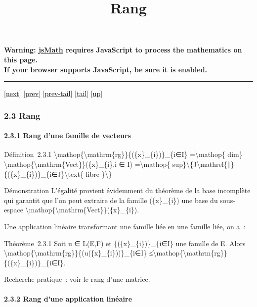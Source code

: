 \documentclass[]{article}
\title{Rang}
\author{}
\date{}
\begin{document}
\maketitle

\textbf{Warning: \href{http://www.math.union.edu/locate/jsMath}{jsMath}
requires JavaScript to process the mathematics on this page.\\ If your
browser supports JavaScript, be sure it is enabled.}

\begin{center}\rule{3in}{0.4pt}\end{center}

{[}\href{coursse10.html}{next}{]} {[}\href{coursse8.html}{prev}{]}
{[}\href{coursse8.html\#tailcoursse8.html}{prev-tail}{]}
{[}\hyperref[tailcoursse9.html]{tail}{]}
{[}\href{coursch3.html\#coursse9.html}{up}{]}

\subsubsection{2.3 Rang}

\paragraph{2.3.1 Rang d'une famille de vecteurs}

Définition~2.3.1
\textbackslash{}mathop\{\textbackslash{}mathrm\{rg\}\}\{(\{x\}\_\{i\})\}\_\{i∈I\}
=\textbackslash{}mathop\{ dim\}
\textbackslash{}mathop\{\textbackslash{}mathrm\{Vect\}\}(\{x\}\_\{i\},i
∈ I) =\textbackslash{}mathop\{
sup\}\textbackslash{}\{\textbar{}J\textbar{}\textbackslash{}mathrel\{∣\}\{(\{x\}\_\{i\})\}\_\{i∈J\}\textbackslash{}text\{
libre \}\textbackslash{}\}

Démonstration L'égalité provient évidemment du théorème de la base
incomplète qui garantit que l'on peut extraire de la famille
(\{x\}\_\{i\}) une base du sous-espace
\textbackslash{}mathop\{\textbackslash{}mathrm\{Vect\}\}(\{x\}\_\{i\}).

Une application linéaire transformant une famille liée en une famille
liée, on a~:

Théorème~2.3.1 Soit u ∈ L(E,F) et \{(\{x\}\_\{i\})\}\_\{i∈I\} une
famille de E. Alors
\textbackslash{}mathop\{\textbackslash{}mathrm\{rg\}\}\{(u(\{x\}\_\{i\}))\}\_\{i∈I\}
≤\textbackslash{}mathop\{\textbackslash{}mathrm\{rg\}\}\{(\{x\}\_\{i\})\}\_\{i∈I\}.

Recherche pratique~: voir le rang d'une matrice.

\paragraph{2.3.2 Rang d'une application linéaire}
\end{document}
